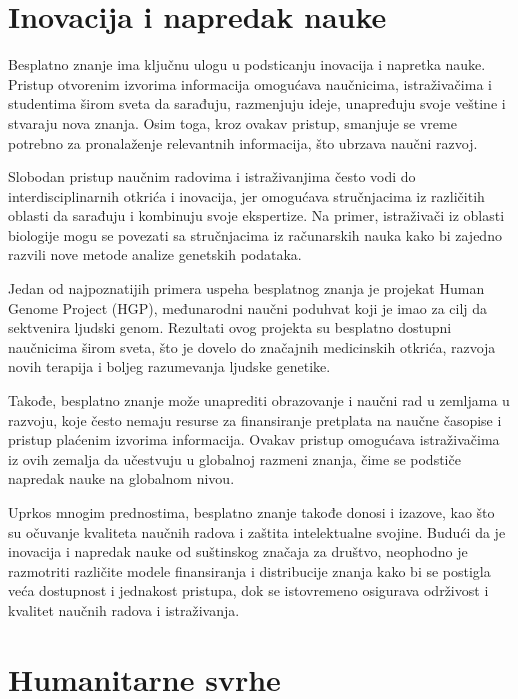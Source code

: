 \documentclass[a4paper]{article}
\begin{document}
{\setlength{\parskip}{1em}

\section{Inovacija i napredak nauke}
\label{sec:Inovacija i napredak nauke}


Besplatno znanje ima ključnu ulogu u podsticanju inovacija i napretka nauke. Pristup otvorenim izvorima informacija omogućava naučnicima, istraživačima i studentima širom sveta da sarađuju, razmenjuju ideje, unapređuju svoje veštine i stvaraju nova znanja. Osim toga, kroz ovakav pristup, smanjuje se vreme potrebno za pronalaženje relevantnih informacija, što ubrzava naučni razvoj.

Slobodan pristup naučnim radovima i istraživanjima često vodi do interdisciplinarnih otkrića i inovacija, jer omogućava stručnjacima iz različitih oblasti da sarađuju i kombinuju svoje ekspertize. Na primer, istraživači iz oblasti biologije mogu se povezati sa stručnjacima iz računarskih nauka kako bi zajedno razvili nove metode analize genetskih podataka.

Jedan od najpoznatijih primera uspeha besplatnog znanja je projekat Human Genome Project (HGP), međunarodni naučni poduhvat koji je imao za cilj da sektvenira ljudski genom. Rezultati ovog projekta su besplatno dostupni naučnicima širom sveta, što je dovelo do značajnih medicinskih otkrića, razvoja novih terapija i boljeg razumevanja ljudske genetike.

Takođe, besplatno znanje može unaprediti obrazovanje i naučni rad u zemljama u razvoju, koje često nemaju resurse za finansiranje pretplata na naučne časopise i pristup plaćenim izvorima informacija. Ovakav pristup omogućava istraživačima iz ovih zemalja da učestvuju u globalnoj razmeni znanja, čime se podstiče napredak nauke na globalnom nivou.

Uprkos mnogim prednostima, besplatno znanje takođe donosi i izazove, kao što su očuvanje kvaliteta naučnih radova i zaštita intelektualne svojine. Budući da je inovacija i napredak nauke od suštinskog značaja za društvo, neophodno je razmotriti različite modele finansiranja i distribucije znanja kako bi se postigla veća dostupnost i jednakost pristupa, dok se istovremeno osigurava održivost i kvalitet naučnih radova i istraživanja.


\setlength{\parskip}{2em}

\section{Humanitarne svrhe}
\label{Humanitarne svrhe}


}
\end{document}
